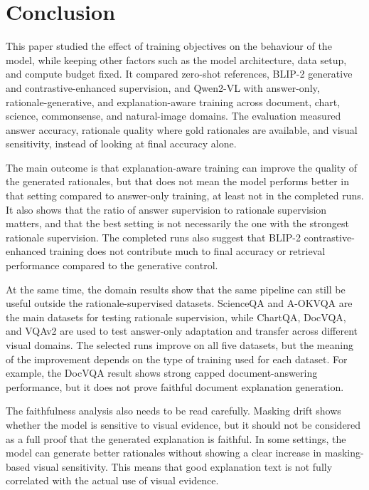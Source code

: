 \documentclass[preprint,12pt]{elsarticle}
\begin{document}
\FloatBarrier

\section{Conclusion}
This paper studied the effect of training objectives on the behaviour of the model, while keeping other factors such as the model architecture, data setup, and compute budget fixed.
It compared zero-shot references, BLIP-2 generative and contrastive-enhanced supervision, and Qwen2-VL with answer-only, rationale-generative, and explanation-aware training across document, chart, science, commonsense, and natural-image domains.
The evaluation measured answer accuracy, rationale quality where gold rationales are available, and visual sensitivity, instead of looking at final accuracy alone.

The main outcome is that explanation-aware training can improve the quality of the generated rationales, but that does not mean the model performs better in that setting compared to answer-only training, at least not in the completed runs.
It also shows that the ratio of answer supervision to rationale supervision matters, and that the best setting is not necessarily the one with the strongest rationale supervision.
The completed runs also suggest that BLIP-2 contrastive-enhanced training does not contribute much to final accuracy or retrieval performance compared to the generative control.

At the same time, the domain results show that the same pipeline can still be useful outside the rationale-supervised datasets.
ScienceQA and A-OKVQA are the main datasets for testing rationale supervision, while ChartQA, DocVQA, and VQAv2 are used to test answer-only adaptation and transfer across different visual domains.
The selected runs improve on all five datasets, but the meaning of the improvement depends on the type of training used for each dataset.
For example, the DocVQA result shows strong capped document-answering performance, but it does not prove faithful document explanation generation.

The faithfulness analysis also needs to be read carefully.
Masking drift shows whether the model is sensitive to visual evidence, but it should not be considered as a full proof that the generated explanation is faithful.
In some settings, the model can generate better rationales without showing a clear increase in masking-based visual sensitivity.
This means that good explanation text is not fully correlated with the actual use of visual evidence.
\end{document}

